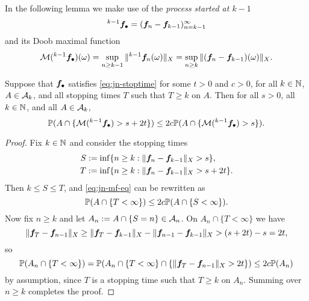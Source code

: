 In the following lemma we make use of the \emph{process started at $k-1$}
\begin{equation*}
  {}^{k-1}\mb{f}_{\bullet} = (\mb{f}_n - \mb{f}_{k-1})_{n = k-1}^{\infty}
\end{equation*}
and its Doob maximal function
\begin{equation*}
  \mc{M}({}^{k-1}\mb{f}_{\bullet})(\omega) = \sup_{n \geq k-1} \|{}^{k-1}\mb{f}_n(\omega)\|_X = \sup_{n \geq k} \|(\mb{f}_n - \mb{f}_{k-1})(\omega)\|_X.
\end{equation*}

\begin{lem}\label{lem:jn-mf}
  Suppose that $\mb{f}_{\bullet}$ satisfies \eqref{eq:jn-stoptime} for some $t > 0$ and $c > 0$, for all $k \in \N$, $A \in \mc{A}_k$, and all stopping times $T$ such that $T \geq k$ on $A$.
  Then for all $s > 0$, all $k \in \N$, and all $A \in \mc{A}_{k}$,
  \begin{equation}\label{eq:jn-mf-eq}
    \P(A \cap \{ \mc{M}({}^{k-1} \mb{f}_{\bullet}) > s + 2t \}) \leq 2c \P(A \cap \{  \mc{M}({}^{k-1} \mb{f}_{\bullet}) > s \}).
  \end{equation}
\end{lem}

\begin{proof}
  Fix $k \in \N$ and consider the stopping times
  \begin{equation*}
    \begin{aligned}
      S &:= \inf\{n \geq k : \|\mb{f}_n - \mb{f}_{k-1}\|_{X} > s\}, \\
      T &:= \inf\{n \geq k : \|\mb{f}_n - \mb{f}_{k-1}\|_{X} > s + 2t\}.
    \end{aligned}
  \end{equation*}
  Then $k \leq S \leq T$, and \eqref{eq:jn-mf-eq} can be rewritten as
  \begin{equation*}
    \P(A \cap \{T < \infty\}) \leq 2c \P(A \cap \{S < \infty\}).
  \end{equation*}
  Now fix $n \geq k$ and let $A_n := A \cap \{S = n\} \in \mc{A}_n$. 
  On $A_n \cap \{T < \infty\}$ we have
  \begin{equation*}
    \|\mb{f}_{T} - \mb{f}_{n-1}\|_{X} \geq \|\mb{f}_{T} - \mb{f}_{k-1}\|_{X} - \|\mb{f}_{n-1} - \mb{f}_{k-1}\|_{X} > (s + 2t) - s = 2t,
  \end{equation*}
  so
  \begin{equation*}
    \P(A_n \cap \{T < \infty\}) = \P(A_n \cap \{T < \infty\} \cap \{\|\mb{f}_{T} - \mb{f}_{n-1}\|_{X} > 2t\} )
    \leq 2c \P(A_n)
  \end{equation*}
  by assumption, since $T$ is a stopping time such that $T \geq k$ on $A_{n}$.
  Summing over $n \geq k$ completes the proof.
\end{proof}


